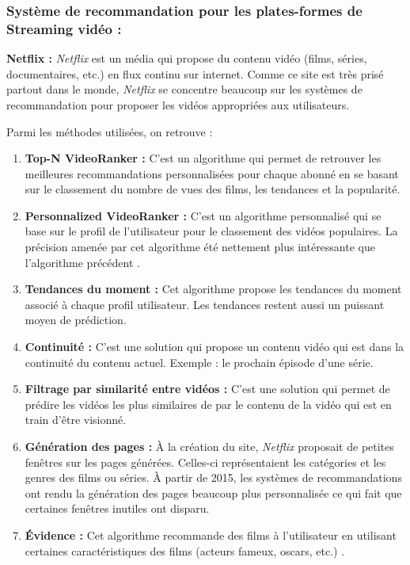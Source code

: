 \subsubsection{Système de recommandation pour les plates-formes de Streaming vidéo :}
\textbf{Netflix :} \emph{Netflix} est un média qui propose du contenu vidéo (films, séries, documentaires, etc.) en flux continu sur internet. Comme ce site est très prisé partout dans le monde, \emph{Netflix} se concentre beaucoup sur les systèmes de recommandation pour proposer les vidéos appropriées aux utilisateurs.

Parmi les méthodes utilisées, on retrouve :
\begin{enumerate}
    \item \textbf{Top-N VideoRanker :} C'est un algorithme qui permet de retrouver les meilleures recommandations personnalisées pour chaque abonné en se basant sur le classement du nombre de vues des films, les tendances et la popularité.\\
    
    \item \textbf{Personnalized VideoRanker :} C'est un algorithme personnalisé qui se base sur le profil de l'utilisateur pour le classement des vidéos populaires. La précision amenée par cet algorithme été nettement plus intéressante que l'algorithme précédent \cite{netflix}.\\
    
    \item \textbf{Tendances du moment :} Cet algorithme propose les tendances du moment associé à chaque profil utilisateur. Les tendances restent aussi un puissant moyen de prédiction.\\
    
    \item \textbf{Continuité :} C'est une solution qui propose un contenu vidéo qui est dans la continuité du contenu actuel. Exemple : le prochain épisode d'une série.\\
    
    \item \textbf{Filtrage par similarité entre vidéos :} C'est une solution qui permet de prédire les vidéos les plus similaires de par le contenu de la vidéo qui est en train d'être visionné.\\
    
    \item \textbf{Génération des pages :} À la création du site, \emph{Netflix} proposait de petites fenêtres sur les pages générées. Celles-ci représentaient les catégories et les genres des films ou séries. À partir de 2015, les systèmes de recommandations ont rendu la génération des pages beaucoup plus personnalisée ce qui fait que certaines fenêtres inutiles ont disparu.\\
    
    \item \textbf{Évidence :} Cet algorithme recommande des films à l'utilisateur en utilisant certaines caractéristiques des films (acteurs fameux, oscars, etc.) \cite{netflix}.
\end{enumerate}

